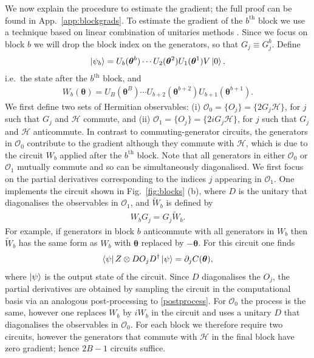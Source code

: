 \documentclass[twocolumn]{revtex4-2}
\renewcommand{\vec}{\boldsymbol}
\begin{document}
We now explain the procedure to estimate the gradient; the full proof can be found in App.\ \ref{app:blockgrads}. To estimate the gradient of the $b^{\text{th}}$ block we use a technique based on linear combination of unitaries methods \cite{childs2012hamiltonian}. Since we focus on block $b$ we will drop the block index on the generators, so that $G_j\equiv G_j^b$. Define 
\begin{align}
\ket{\psi_b}=U_b(\vec{\theta}^b)\cdots U_2(\vec{\theta}^2)U_1(\vec{\theta}^1)V\ket{0},   
\end{align}
i.e.\ the state after the $b^{\text{th}}$ block, and 
\begin{align}\label{Wbdef}
    W_b(\vec{\theta}) = U_B(\vec{\theta}^B)\cdots U_{b+2}(\vec{\theta}^{b+2})U_{b+1}(\vec{\theta}^{b+1}).
\end{align}
We first define two sets of Hermitian observables: (i) $\mathcal{O}_0 = \{O_j\} = \{2G_j\mathcal{H}\}$, for $j$ such that $G_j$ and $\mathcal{H}$ commute, and (ii) $\mathcal{O}_1 = \{O_j\} = \{2iG_j\mathcal{H}\}$, for $j$ such that $G_j$ and $\mathcal{H}$ anticommute.
In contrast to commuting-generator circuits, the generators in $\mathcal{O}_0$ contribute to the gradient although they commute with $\mathcal{H}$, which is due to the circuit $W_b$ applied after the $b^{\text{th}}$ block.
Note that all generators in either $\mathcal{O}_0$ or $\mathcal{O}_1$ mutually commute and so can be simultaneously diagonalised. We first focus on the partial derivatives corresponding to the indices $j$ appearing in $\mathcal{O}_1$. One implements the circuit shown in Fig.\ \ref{fig:blocks} (b), where $D$ is the unitary that diagonalises the observables in $\mathcal{O}_1$, and $\tilde{W}_b$ is defined by 
\begin{align}\label{Wbtildedef}
    W_bG_j = G_j\tilde{W}_b.
\end{align}
For example, if generators in block $b$ anticommute with all generators in $W_b$ then $\tilde{W}_b$ has the same form as $W_b$ with $\vec{\theta}$ replaced by $-\vec{\theta}$. 
For this circuit one finds 
\begin{align}
    \bra{\psi} Z\otimes DO_jD^\dagger\ket{\psi}=\partial_j C(\vec{\theta}),
\end{align}
where $\ket{\psi}$ is the output state of the circuit. Since $D$ diagonalises the $O_j$, the partial derivatives are obtained by sampling the circuit in the computational basis via an analogous post-processing to \eqref{postprocess}. For $\mathcal{O}_0$ the process is the same, however one replaces $W_b$ by $iW_b$ in the circuit and uses a unitary $D$ that diagonalises the observables in $\mathcal{O}_0$. For each block we therefore require two circuits, however the generators that commute with $\mathcal{H}$ in the final block have zero gradient; hence $2B-1$ circuits suffice. 
\end{document}
